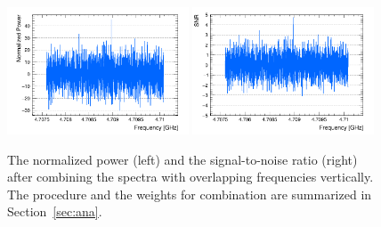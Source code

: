 \begin{figure}[htbp]                                                                                                  
    \centering                                                                                                                       
    \includegraphics[width=0.48\textwidth]{figures/Power_CombSpectrum_FaxionRun_AllSteps_Rescan_SG4_W201.png}
    \includegraphics[width=0.48\textwidth]{figures/SNR_CombSpectrum_FaxionRun_AllSteps_Rescan_SG4_W201.png}
    \caption{The normalized power (left) and the 
signal-to-noise ratio (right) after combining the spectra with overlapping 
frequencies vertically. The procedure and the weights for combination 
are summarized in Section~\ref{sec:ana}.}                
\label{fig:faxioncombine}                                                                                                            
\end{figure}                       


